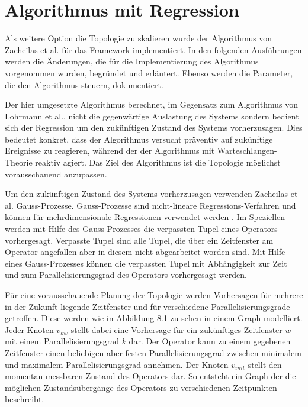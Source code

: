 \chapter{Algorithmus mit Regression}

Als weitere Option die Topologie zu skalieren wurde der Algorithmus von Zacheilas et al. \cite{zacheilas_elastic_2015} für das Framework implementiert.
In den folgenden Ausführungen werden die Änderungen, die für die Implementierung des Algorithmus vorgenommen wurden, begründet und erläutert.
Ebenso werden die Parameter, die den Algorithmus steuern, dokumentiert.

Der hier umgesetzte Algorithmus berechnet, im Gegensatz zum Algorithmus von Lohrmann et al., nicht die gegenwärtige Auslastung des Systems sondern bedient sich der Regression um den zukünftigen Zustand des Systems vorherzusagen.
Dies bedeutet konkret, dass der Algorithmus versucht präventiv auf zukünftige Ereignisse zu reagieren, während der der Algorithmus mit Warteschlangen-Theorie reaktiv agiert.
Das Ziel des Algorithmus ist die Topologie möglichst vorausschauend anzupassen.

Um den zukünftigen Zustand des Systems vorherzusagen verwenden Zacheilas et al. Gauss-Prozesse.
Gauss-Prozesse sind nicht-lineare Regressions-Verfahren und können für mehrdimensionale Regressionen verwendet werden \cite{rasmussen2004gaussian}.
Im Speziellen werden mit Hilfe des Gauss-Prozesses die verpassten Tupel eines Operators vorhergesagt.
Verpasste Tupel sind alle Tupel, die über ein Zeitfenster am Operator angefallen aber in diesem nicht abgearbeitet worden sind.
Mit Hilfe eines Gauss-Prozesses können die verpassten Tupel mit Abhängigkeit zur Zeit und zum Parallelisierungsgrad des Operators vorhergesagt werden.

Für eine vorausschauende Planung der Topologie werden Vorhersagen für mehrere in der Zukunft liegende Zeitfenster und für verschiedene Parallelisierungsgrade getroffen.
Diese werden wie in Abbildung 8.1 zu sehen in einem Graph modelliert.
Jeder Knoten \(v_{kw}\) stellt dabei eine Vorhersage für ein zukünftiges Zeitfenster \(w\) mit einem Parallelisierungsgrad \(k\) dar.
Der Operator kann zu einem gegebenen Zeitfenster einen beliebigen aber festen Parallelisierungsgrad zwischen minimalem und maximalem Parallelisierungsgrad annehmen.
Der Knoten \(v_{init}\) stellt den momentan messbaren Zustand des Operators dar.
So entsteht ein Graph der die möglichen Zustandsübergänge des Operators zu verschiedenen Zeitpunkten beschreibt.

